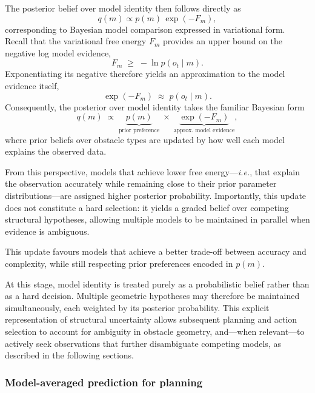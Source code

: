 \documentclass[a4paper, twoside]{article}
\begin{document}
The posterior belief over model identity then follows directly as
\begin{equation}
\label{eq:q_m}
q(m) \propto p(m)\,\exp(-F_m),
\end{equation}
corresponding to Bayesian model comparison expressed in variational form.
Recall that the variational free energy $F_m$ provides an upper bound on the negative log
model evidence,
\begin{equation}
F_m \;\ge\; -\ln p(o_t \mid m).
\end{equation}
Exponentiating its negative therefore yields an approximation to the model evidence itself,
\begin{equation}
\exp(-F_m) \;\approx\; p(o_t \mid m).
\end{equation}
Consequently, the posterior over model identity takes the familiar Bayesian form
\begin{equation}
q(m)
\;\propto\;
\underbrace{p(m)}_{\text{prior preference}}
\;\times\;
\underbrace{\exp(-F_m)}_{\text{approx.\ model evidence}},
\end{equation}
where prior beliefs over obstacle types are updated by how well each model explains the
observed data.

From this perspective, models that achieve lower free energy—\emph{i.e.}, that explain the
observation accurately while remaining close to their prior parameter distributions—are
assigned higher posterior probability.
Importantly, this update does not constitute a hard selection: it yields a graded belief
over competing structural hypotheses, allowing multiple models to be maintained in parallel
when evidence is ambiguous.

This update favours models that achieve a better trade-off between accuracy and complexity,
while still respecting prior preferences encoded in $p(m)$.

At this stage, model identity is treated purely as a probabilistic belief rather than as a
hard decision.
Multiple geometric hypotheses may therefore be maintained simultaneously, each weighted by
its posterior probability.
This explicit representation of structural uncertainty allows subsequent planning and
action selection to account for ambiguity in obstacle geometry, and—when relevant—to actively
seek observations that further disambiguate competing models, as described in the following
sections.


\subsubsection{Model-averaged prediction for planning}
\label{sec:model_averaged_prediction}
\end{document}
